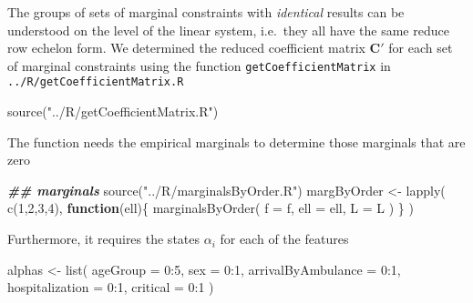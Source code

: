 \documentclass[
]{article}
\newenvironment{Shaded}{\begin{snugshade}}{\end{snugshade}}
\newcommand{\AttributeTok}[1]{\textcolor[rgb]{0.77,0.63,0.00}{#1}}
\newcommand{\ControlFlowTok}[1]{\textcolor[rgb]{0.13,0.29,0.53}{\textbf{#1}}}
\newcommand{\DecValTok}[1]{\textcolor[rgb]{0.00,0.00,0.81}{#1}}
\newcommand{\DocumentationTok}[1]{\textcolor[rgb]{0.56,0.35,0.01}{\textbf{\textit{#1}}}}
\newcommand{\FunctionTok}[1]{\textcolor[rgb]{0.00,0.00,0.00}{#1}}
\newcommand{\NormalTok}[1]{#1}
\newcommand{\OtherTok}[1]{\textcolor[rgb]{0.56,0.35,0.01}{#1}}
\newcommand{\SpecialCharTok}[1]{\textcolor[rgb]{0.00,0.00,0.00}{#1}}
\newcommand{\StringTok}[1]{\textcolor[rgb]{0.31,0.60,0.02}{#1}}
\begin{document}
The groups of sets of marginal constraints with \emph{identical} results
can be understood on the level of the linear system, i.e.~they all have
the same reduce row echelon form. We determined the reduced coefficient
matrix \(\mathbf{C}'\) for each set of marginal constraints using the
function \texttt{getCoefficientMatrix} in
\texttt{../R/getCoefficientMatrix.R}

\begin{Shaded}
\begin{Highlighting}[]
\FunctionTok{source}\NormalTok{(}\StringTok{"../R/getCoefficientMatrix.R"}\NormalTok{)}
\end{Highlighting}
\end{Shaded}

The function needs the empirical marginals to determine those marginals
that are zero

\begin{Shaded}
\begin{Highlighting}[]
\DocumentationTok{\#\# marginals}
\FunctionTok{source}\NormalTok{(}\StringTok{"../R/marginalsByOrder.R"}\NormalTok{)}
\NormalTok{margByOrder }\OtherTok{\textless{}{-}} \FunctionTok{lapply}\NormalTok{(}
    \FunctionTok{c}\NormalTok{(}\DecValTok{1}\NormalTok{,}\DecValTok{2}\NormalTok{,}\DecValTok{3}\NormalTok{,}\DecValTok{4}\NormalTok{),}
    \ControlFlowTok{function}\NormalTok{(ell)\{}
        \FunctionTok{marginalsByOrder}\NormalTok{(}
            \AttributeTok{f =}\NormalTok{ f,}
            \AttributeTok{ell =}\NormalTok{ ell,}
            \AttributeTok{L =}\NormalTok{ L}
\NormalTok{        )}
\NormalTok{    \}}
\NormalTok{)}
\end{Highlighting}
\end{Shaded}

Furthermore, it requires the states \(\alpha_i\) for each of the
features

\begin{Shaded}
\begin{Highlighting}[]
\NormalTok{alphas }\OtherTok{\textless{}{-}} \FunctionTok{list}\NormalTok{(}
    \AttributeTok{ageGroup =} \DecValTok{0}\SpecialCharTok{:}\DecValTok{5}\NormalTok{,}
    \AttributeTok{sex =} \DecValTok{0}\SpecialCharTok{:}\DecValTok{1}\NormalTok{,}
    \AttributeTok{arrivalByAmbulance =} \DecValTok{0}\SpecialCharTok{:}\DecValTok{1}\NormalTok{,}
    \AttributeTok{hospitalization =} \DecValTok{0}\SpecialCharTok{:}\DecValTok{1}\NormalTok{,}
    \AttributeTok{critical =} \DecValTok{0}\SpecialCharTok{:}\DecValTok{1}
\NormalTok{)}
\end{Highlighting}
\end{Shaded}
\end{document}
